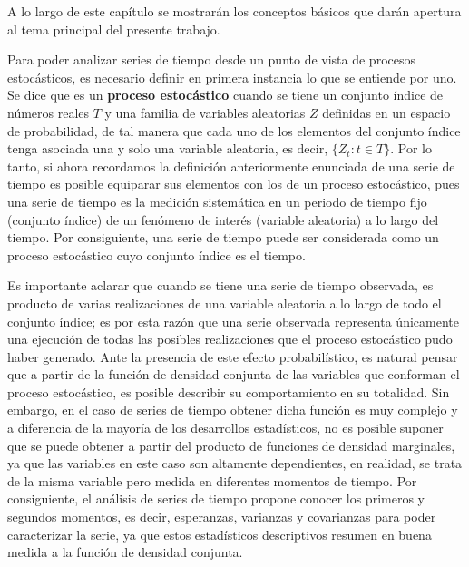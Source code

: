 A lo largo de este capítulo se mostrarán los conceptos básicos que darán apertura al tema principal del presente trabajo.\newline

Para poder analizar series de tiempo desde un punto de vista de procesos estocásticos, es necesario definir en primera instancia lo que se entiende por uno. Se dice que es un \textbf{proceso estocástico} cuando se tiene un conjunto índice de números reales $T$ y una familia de variables aleatorias $Z$ definidas en un espacio de probabilidad, de tal manera que cada uno de los elementos del conjunto índice tenga asociada una y solo una variable aleatoria, es decir,  $\{Z_t: t \in T\}$. Por lo tanto, si ahora recordamos la definición anteriormente enunciada de una serie de tiempo es posible equiparar sus elementos con los de un proceso estocástico, pues una serie de tiempo es la medición sistemática en un periodo de tiempo fijo (conjunto índice) de un fenómeno de interés (variable aleatoria) a lo largo del tiempo. Por consiguiente, una serie de tiempo puede ser considerada como un  proceso estocástico cuyo conjunto índice es el tiempo.\newline


Es importante aclarar que cuando se tiene una serie de tiempo observada, es producto de varias realizaciones de una variable aleatoria a lo largo de todo el conjunto índice; es por esta razón que una serie observada representa únicamente una ejecución de todas las posibles realizaciones que el proceso estocástico pudo haber generado. Ante la presencia de este efecto probabilístico, es natural pensar que a partir de la función de densidad conjunta de las variables que conforman el proceso estocástico, es posible describir su comportamiento en su totalidad. Sin embargo, en el caso de series de tiempo obtener dicha función es muy complejo y a diferencia de la mayoría de los desarrollos estadísticos, no es posible suponer que se puede obtener a partir del producto de funciones de densidad marginales, ya que las variables en este caso son altamente dependientes, en realidad, se trata de la misma variable pero medida en diferentes momentos de tiempo. Por consiguiente, el análisis de series de tiempo propone conocer los primeros y segundos momentos, es decir, esperanzas, varianzas y covarianzas para poder caracterizar la serie, ya que estos estadísticos descriptivos resumen en buena medida a la función de densidad conjunta.\newline

